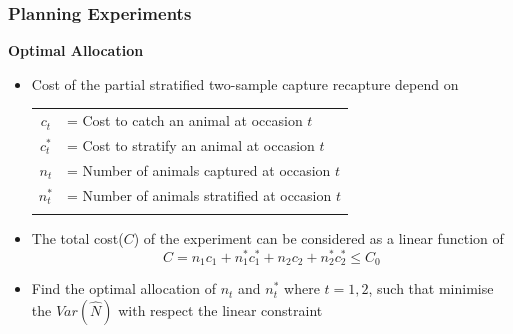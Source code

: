 \documentclass{beamer}
\begin{document}
\begin{frame} \frametitle{Planning Experiments}
\textbf{\scriptsize Optimal Allocation}
\begin{itemize}
\item {\footnotesize Cost of the partial stratified  two-sample capture recapture depend on }

{\tiny 
\begin{center}
\begin{tabular}{c l}
\vspace{2pt}
$c_{t}$ &= Cost to catch an animal at occasion $t$\\  \vspace{2pt}
$c_{t}^{*}$ &= Cost to stratify an animal at occasion $t$\\ \vspace{2pt}
$n_t$ &= Number of animals captured at occasion $t$ \\\vspace{2pt}
$n_{t}^{*}$ &= Number of animals stratified at  occasion $t$ \\\vspace{2pt}
\end{tabular}
\end{center}
}

\item  {\footnotesize The total cost($C$) of the experiment can be  considered as a linear function of
\begin{equation*}
C = n_{1} c_{1}  + n_{1}^{*} c_{1}^{*} +  n_{2} c_{2}  + n_{2}^{*} c_{2}^{*} \leq C_{0}
\end{equation*}
}
\item {\footnotesize Find the optimal allocation of $n_{t}$ and  $n_{t}^{*} $ where $t=1,2$, such that minimise the $Var(\hat{N})$ with respect the linear constraint}
\end{itemize}
\end{frame}

\end{document}
